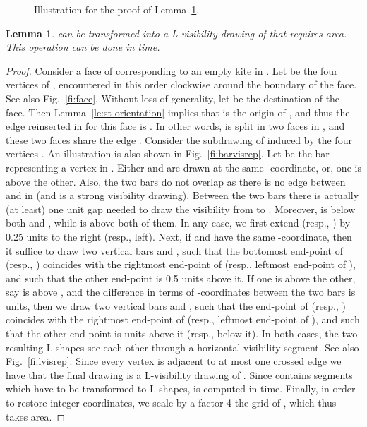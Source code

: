 \documentclass[a4paper]{article}
\newtheorem{lemma}{Lemma}
\begin{document}
\begin{figure}[t]
\centering
{}\hfil
{}\hfil
{}\hfil
\caption{\small Illustration for the proof of Lemma~\ref{le:drawing}.}
\end{figure}

\begin{lemma}\label{le:drawing}
 can be transformed into a L-visibility drawing  of  that requires  area. This operation can be done in  time.
\end{lemma}
\begin{proof}
Consider a face  of  corresponding to an empty kite  in . Let  be the four vertices of , encountered in this order clockwise around the boundary of the face. See also Fig.~\ref{fi:face}. Without loss of generality, let  be the destination of the face. Then Lemma~\ref{le:st-orientation} implies that  is the origin of , and thus the edge reinserted in  for this face is . In other words,  is split in two faces in , and these two faces share the edge . Consider the subdrawing of  induced by the four vertices  . An illustration is also shown in Fig.~\ref{fi:barvisrep}. Let  be the bar representing a vertex  in . Either  and  are drawn at the same -coordinate, or, one is above the other. Also, the two bars do not overlap as there is no edge between  and  in  (and  is a strong visibility drawing). Between the two bars there is actually (at least) one unit gap needed to draw the visibility from  to . Moreover,  is below both  and , while  is above both of them. In any case, we first extend  (resp., ) by 0.25 units to the right (resp., left). Next, if  and  have the same -coordinate, then it suffice to draw two vertical bars  and , such that the bottomost end-point of  (resp., ) coincides with the rightmost end-point of  (resp., leftmost end-point of ), and such that the other end-point is 0.5 units above it.  If one is above the other, say  is above , and the difference in terms of -coordinates between the two bars is  units, then we draw two vertical bars  and , such that the end-point of  (resp., ) coincides with the rightmost end-point of  (resp., leftmost end-point of ), and such that the other end-point is  units above it (resp., below it). In both cases, the two resulting L-shapes see each other through a horizontal visibility segment. See also Fig.~\ref{fi:lvisrep}. Since every vertex is adjacent to at most one crossed edge  we have that the final drawing  is a L-visibility drawing of . Since  contains  segments which have to be transformed to L-shapes,  is computed in  time. Finally, in order to restore integer coordinates, we scale by a factor 4 the grid of , which thus takes  area.
\end{proof}
\end{document}
